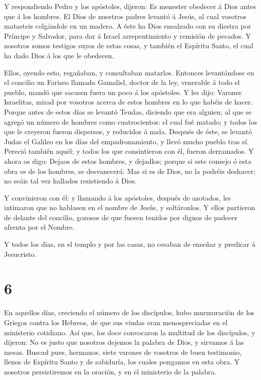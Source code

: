  Y respondiendo Pedro y los apóstoles, dijeron: Es menester
obedecer á Dios antes que á los hombres.  El Dios de
nuestros padres levantó á Jesús, al cual vosotros matasteis colgándole
en un madero.  A éste ha Dios ensalzado con su diestra por
Príncipe y Salvador, para dar á Israel arrepentimiento y remisión de
pecados.  Y nosotros somos testigos suyos de estas cosas, y
también el Espíritu Santo, el cual ha dado Dios á los que le obedecen.

 Ellos, oyendo esto, regañaban, y consultaban matarlos.
 Entonces levantándose en el concilio un Fariseo llamado
Gamaliel, doctor de la ley, venerable á todo el pueblo, mandó que
sacasen fuera un poco á los apóstoles.  Y les dijo: Varones
Israelitas, mirad por vosotros acerca de estos hombres en lo que habéis
de hacer.  Porque antes de estos días se levantó Teudas,
diciendo que era alguien; al que se agregó un número de hombres como
cuatrocientos: el cual fué matado; y todos los que le creyeron fueron
dispersos, y reducidos á nada.  Después de éste, se levantó
Judas el Galileo en los días del empadronamiento, y llevó mucho pueblo
tras sí. Pereció también aquél; y todos los que consintieron con él,
fueron derramados.  Y ahora os digo: Dejaos de estos
hombres, y dejadlos; porque si este consejo ó esta obra es de los
hombres, se desvanecerá:  Mas si es de Dios, no la podréis
deshacer; no seáis tal vez hallados resistiendo á Dios.

 Y convinieron con él: y llamando á los apóstoles, después
de azotados, les intimaron que no hablasen en el nombre de Jesús, y
soltáronlos.  Y ellos partieron de delante del concilio,
gozosos de que fuesen tenidos por dignos de padecer afrenta por el
Nombre.

 Y todos los días, en el templo y por las casas, no cesaban
de enseñar y predicar á Jesucristo.

\hypertarget{section-5}{%
\section{6}\label{section-5}}

 En aquellos días, creciendo el número de los discípulos,
hubo murmuración de los Griegos contra los Hebreos, de que sus viudas
eran menospreciadas en el ministerio cotidiano.  Así que,
los doce convocaron la multitud de los discípulos, y dijeron: No es
justo que nosotros dejemos la palabra de Dios, y sirvamos á las mesas.
 Buscad pues, hermanos, siete varones de vosotros de buen
testimonio, llenos de Espíritu Santo y de sabiduría, los cuales pongamos
en esta obra.  Y nosotros persistiremos en la oración, y en
el ministerio de la palabra.


